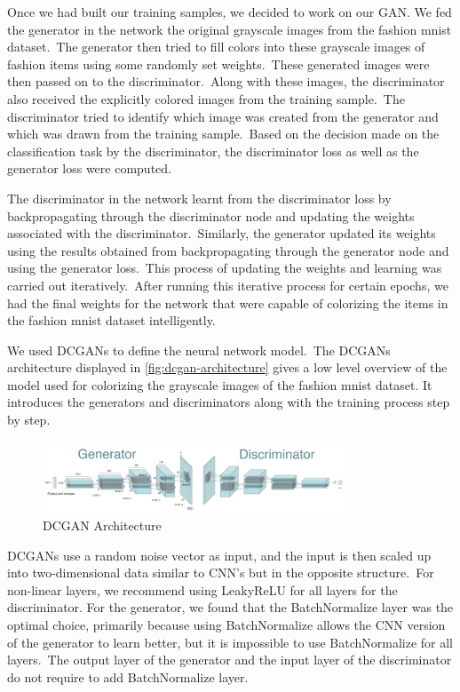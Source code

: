 \documentclass[conference]{IEEEtran}
\begin{document}
    Once we had built our training samples, we decided to work on our GAN. We fed the generator in the network the original grayscale images from the fashion mnist dataset.\ The generator then tried to fill colors into these grayscale images of fashion items using some randomly set weights.\ These generated images were then passed on to the discriminator.\ Along with these images, the discriminator also received the explicitly colored images from the training sample.\ The discriminator tried to identify which image was created from the generator and which was drawn from the training sample.\ Based on the decision made on the classification task by the discriminator, the discriminator loss as well as the generator loss were computed.

    The discriminator in the network learnt from the discriminator loss by backpropagating through the discriminator node and updating the weights associated with the discriminator.\ Similarly, the generator updated its weights using the results obtained from backpropagating through the generator node and using the generator loss.\ This process of updating the weights and learning was carried out iteratively.\ After running this iterative process for certain epochs, we had the final weights for the network that were capable of colorizing the items in the fashion mnist dataset intelligently.
    
    We used DCGANs to define the neural network model.\ The DCGANs architecture displayed in \autoref{fig:dcgan-architecture} gives a low level overview of the model used for colorizing the grayscale images of the fashion mnist dataset. It introduces the generators and discriminators along with the training process step by step.

    \begin{figure}
        \caption{DCGAN Architecture}
        \label{fig:dcgan-architecture}
        \includegraphics[width=9cm]{architecture.png}
        \centering
    \end{figure}

     DCGANs use a random noise vector as input, and the input is then scaled up into two-dimensional data similar to CNN's but in the opposite structure.\ For non-linear layers, we recommend using LeakyReLU for all layers for the discriminator. For the generator, we found that the BatchNormalize layer was the optimal choice, primarily because using BatchNormalize allows the CNN version of the generator to learn better, but it is impossible to use BatchNormalize for all layers.\ The output layer of the generator and the input layer of the discriminator do not require to add BatchNormalize layer.\ 
\end{document}
